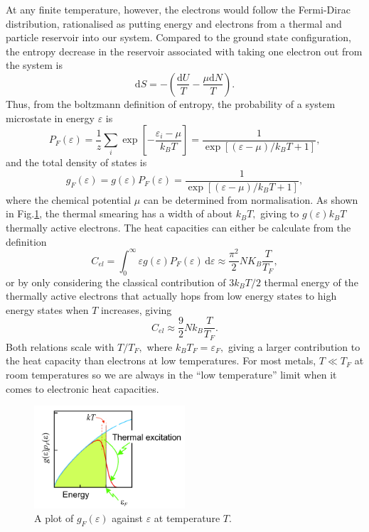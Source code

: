 \documentclass{article}
\theoremstyle{nonumberplain}
\begin{document}
At any finite temperature, however, the electrons would follow the Fermi-Dirac distribution, rationalised as putting energy and electrons from a thermal and particle reservoir into our system. Compared to the ground state configuration, the entropy decrease in the reservoir associated with taking one electron out from the system is
\[
    \mathrm{d} S = -\left(\frac{\mathrm{d} U}{T} - \frac{\mu \mathrm{d} N}{T}\right).
\]
Thus, from the boltzmann definition of entropy, the probability of a system microstate in energy $\varepsilon$ is 
\[
    P_F(\varepsilon) = \frac{1}{z}\sum_{i}^{} \exp \left[ -\frac{\varepsilon_i - \mu }{k_B T}\right] = \frac{1}{\exp \left[(\varepsilon  - \mu ) / k_B T + 1\right]}, 
\]
and the total density of states is 
\[
    \boxed{g_F(\varepsilon ) = g(\varepsilon ) P_F(\varepsilon ) = \frac{1}{\exp \left[(\varepsilon  - \mu ) / k_B T + 1\right]}},
\]
where the chemical potential $\mu$ can be determined from normalisation. As shown in Fig.\ref{fig:electron-fd}, the thermal smearing has a width of about $k_B T,$ giving to $g(\varepsilon) k_B T$ thermally active electrons. The heat capacities can either be calculate from the definition
\[
    C_{el} = \int_{0}^{\infty} \varepsilon g(\varepsilon ) P_F(\varepsilon ) \,\mathrm{d}\varepsilon  \approx \frac{\pi ^{2} }{2}N K_B \frac{T}{T_F},
\]
or by only considering the classical contribution of $3 k_B T /2$ thermal energy of the thermally active electrons that actually hops from low energy states to high energy states when $T$ increases, giving
\[
    C_{el} \approx \frac{9}{2} N k_B \frac{T}{T_F}. 
\]
Both relations scale with $T / T_F,$ where $k_B T_F = \varepsilon_F,$ giving a larger contribution to the heat capacity than electrons at low temperatures. For most metals, $T \ll T_F$ at room temperatures so we are always in the ``low temperature'' limit when it comes to electronic heat capacities. 
\begin{figure}[ht]
    \centering
    \includegraphics[width=0.5\textwidth]{figs/fd-distribution.png}
    \caption{A plot of $g_F(\varepsilon)$ against $\varepsilon$ at temperature $T.$}
    \label{fig:electron-fd}
\end{figure}
\end{document}
